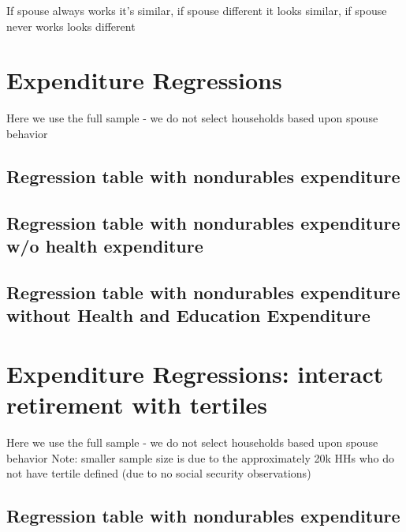\documentclass[a4paper]{article}
\begin{document}
If spouse always works it's similar, if spouse different it looks similar, if spouse never works looks different
\clearpage


\begin{landscape}
\section{Expenditure Regressions}

Here we use the full sample - we do not select households based upon spouse behavior

\subsection{Regression table with nondurables expenditure}

\clearpage

\subsection{Regression table with nondurables expenditure w/o health expenditure} 

\clearpage

\subsection{Regression table with nondurables expenditure without Health and Education Expenditure}

\clearpage


\section{Expenditure Regressions: interact retirement with tertiles}

Here we use the full sample - we do not select households based upon spouse behavior
Note: smaller sample size is due to the approximately 20k HHs who do not have tertile defined (due to no social security observations)

\subsection{Regression table with nondurables expenditure}




\end{landscape}
\end{document}
